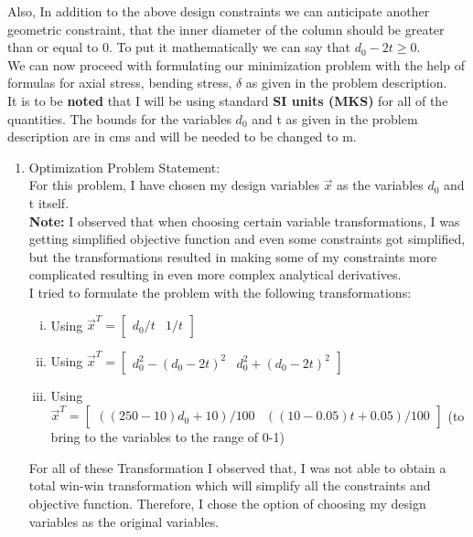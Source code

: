 \documentclass[12pt]{article}
\begin{document}
\begin{enumerate}[I]
Also, In addition to the above design constraints we can anticipate another geometric constraint, that the inner diameter of the column should be greater than or equal to 0. To put it mathematically we can say that $d_0-2t\geq0$.\\

We can now proceed with formulating our minimization problem with the help of formulas for axial stress, bending stress, $\delta$ as given in the problem description.\\

It is to be \textbf{noted} that I will be using standard \textbf{SI units (MKS)} for all of the quantities. The bounds for the variables $d_0$ and t as given in the problem description are in cms and will be needed to be changed to m.\\

\begin{enumerate}[1)]
    \item Optimization Problem Statement:\\
    
    For this problem, I have chosen my design variables $\vec{x}$ as the variables $d_0$ and t itself.\\ 
    
    \textbf{Note:} I observed that when choosing certain variable transformations, I was getting simplified objective function and even some constraints got simplified, but the transformations resulted in making some of my constraints more complicated resulting in even more complex analytical derivatives.\\
    
    I tried to formulate the problem with the following transformations:\\
    \begin{enumerate}[i)]
        \item Using $\vec{x}^T = \begin{bmatrix} d_0/t& 1/t \end{bmatrix}$
        \item Using $\vec{x}^T = \begin{bmatrix} d_0^2-(d_0-2t)^2 & d_0^2+(d_0-2t)^2 \end{bmatrix}$
        \item Using $\vec{x}^T = \begin{bmatrix}  ((250-10)d_0+10)/100 & ((10-0.05)t+0.05)/100\end{bmatrix}$ (to bring to the variables to the range of 0-1)
    \end{enumerate}
    For all of these Transformation I observed that, I was not able to obtain a total win-win transformation which will simplify all the constraints and objective function. Therefore, I chose the option of choosing my design variables as the original variables.\\
    

\end{enumerate}
\end{enumerate}
\end{document}
